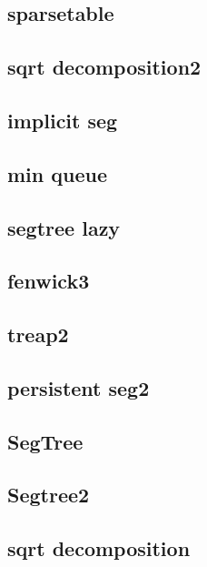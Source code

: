 \subsection{sparsetable}
\raggedbottom
\hrulefill
\subsection{sqrt decomposition2}
\raggedbottom
\hrulefill
\subsection{implicit seg}
\raggedbottom
\hrulefill
\subsection{min queue}
\raggedbottom
\hrulefill
\subsection{segtree lazy}
\raggedbottom
\hrulefill
\subsection{fenwick3}
\raggedbottom
\hrulefill
\subsection{treap2}
\raggedbottom
\hrulefill
\subsection{persistent seg2}
\raggedbottom
\hrulefill
\subsection{SegTree}
\raggedbottom
\hrulefill
\subsection{Segtree2}
\raggedbottom
\hrulefill
\subsection{sqrt decomposition}
\raggedbottom
\hrulefill
